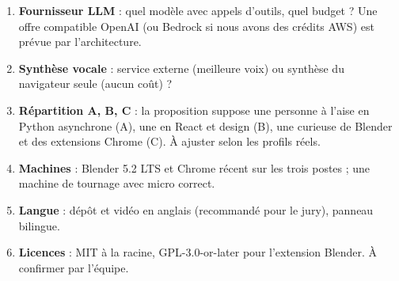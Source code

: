\begin{enumerate}[leftmargin=1.2em]
  \item \textbf{Fournisseur LLM} : quel modèle avec appels d'outils, quel budget ? Une offre compatible OpenAI (ou Bedrock si nous avons des crédits AWS) est prévue par l'architecture.
  \item \textbf{Synthèse vocale} : service externe (meilleure voix) ou synthèse du navigateur seule (aucun coût) ?
  \item \textbf{Répartition A, B, C} : la proposition suppose une personne à l'aise en Python asynchrone (A), une en React et design (B), une curieuse de Blender et des extensions Chrome (C). À ajuster selon les profils réels.
  \item \textbf{Machines} : Blender 5.2 LTS et Chrome récent sur les trois postes ; une machine de tournage avec micro correct.
  \item \textbf{Langue} : dépôt et vidéo en anglais (recommandé pour le jury), panneau bilingue.
  \item \textbf{Licences} : MIT à la racine, GPL-3.0-or-later pour l'extension Blender. À confirmer par l'équipe.
\end{enumerate}
